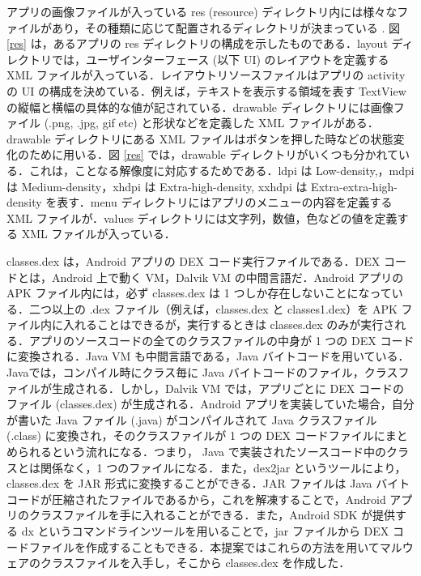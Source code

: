 アプリの画像ファイルが入っている  res (resource) ディレクトリ内には様々なファイルがあり，その種類に応じて配置されるディレクトリが決まっている \cite{resource} . 図 \ref{res} は，あるアプリの res ディレクトリの構成を示したものである．layout  ディレクトリでは，ユーザインターフェース (以下 UI) のレイアウトを定義する XML ファイルが入っている．レイアウトリソースファイルはアプリの activity の UI の構成を決めている．例えば，テキストを表示する領域を表す TextView の縦幅と横幅の具体的な値が記されている．drawable ディレクトリには画像ファイル (.png, .jpg, gif etc) と形状などを定義した XML ファイルがある．drawable ディレクトリにある XML ファイルはボタンを押した時などの状態変化のために用いる．図 \ref{res} では，drawable ディレクトリがいくつも分かれている．これは，ことなる解像度に対応するためである．ldpi は Low-density,，mdpi は Medium-density，xhdpi は Extra-high-density, xxhdpi は Extra-extra-high-density を表す．menu ディレクトリにはアプリのメニューの内容を定義する XML ファイルが．values  ディレクトリには文字列，数値，色などの値を定義する XML ファイルが入っている．

classes.dex は，Android アプリの DEX コード実行ファイルである．DEX コードとは，Android 上で動く VM，Dalvik VM の中間言語だ．Android アプリの APK ファイル内には，必ず classes.dex は 1 つしか存在しないことになっている．二つ以上の .dex ファイル（例えば，classes.dex と classes1.dex）を APK ファイル内に入れることはできるが，実行するときは classes.dex のみが実行される．アプリのソースコードの全てのクラスファイルの中身が 1 つの DEX コードに変換される．Java VM も中間言語である，Java バイトコードを用いている．Javaでは，コンパイル時にクラス毎に Java バイトコードのファイル，クラスファイルが生成される．しかし，Dalvik VM では，アプリごとに DEX コードのファイル (classes.dex) が生成される．Android アプリを実装していた場合，自分が書いた Java ファイル (.java) がコンパイルされて Java クラスファイル (.class) に変換され，そのクラスファイルが 1 つの DEX コードファイルにまとめられるという流れになる．つまり， Java で実装されたソースコード中のクラスとは関係なく，1 つのファイルになる．また，dex2jar \cite{d2jar} というツールにより，classes.dex を JAR 形式に変換することができる．JAR ファイルは Java バイトコードが圧縮されたファイルであるから，これを解凍することで，Android アプリのクラスファイルを手に入れることができる．また，Android SDK が提供する dx というコマンドラインツールを用いることで，jar ファイルから DEX コードファイルを作成することもできる．本提案ではこれらの方法を用いてマルウェアのクラスファイルを入手し，そこから  classes.dex を作成した．


